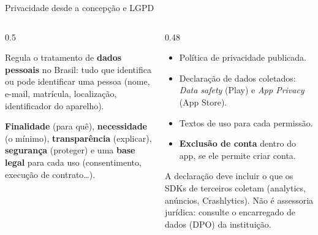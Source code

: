 \begin{frame}{Privacidade desde a concepção e LGPD}
  \begin{columns}[T]
    \begin{column}{0.5\textwidth}
      \begin{definicao}
        Regula o tratamento de \textbf{dados pessoais} no Brasil: tudo que identifica ou pode identificar uma pessoa (nome, e-mail, matrícula, localização, identificador do aparelho).
      \end{definicao}
      \begin{conceito}
        \textbf{Finalidade} (para quê), \textbf{necessidade} (o mínimo), \textbf{transparência} (explicar), \textbf{segurança} (proteger) e uma \textbf{base legal} para cada uso (consentimento, execução de contrato\ldots).
      \end{conceito}
    \end{column}
    \begin{column}{0.48\textwidth}
      \begin{conceito}
        \begin{itemize}
          \item Política de privacidade publicada.
          \item Declaração de dados coletados: \emph{Data safety} (Play) e \emph{App Privacy} (App Store).
          \item Textos de uso para cada permissão.
          \item \textbf{Exclusão de conta} dentro do app, se ele permite criar conta.
        \end{itemize}
      \end{conceito}
      \begin{atencao}
        A declaração deve incluir o que os SDKs de terceiros coletam (analytics, anúncios, Crashlytics). Não é assessoria jurídica: consulte o encarregado de dados (DPO) da instituição.
      \end{atencao}
    \end{column}
  \end{columns}
\end{frame}

